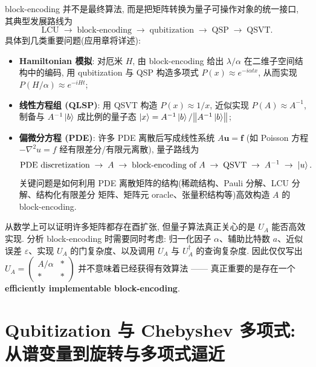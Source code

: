 \documentclass[utf8]{article} %
\numberwithin{equation}{section}   %
\newtheorem{Note}{\hskip 2em {\color{red} 注}}[subsection]
\begin{document}
block-encoding 并不是最终算法, 而是把矩阵转换为量子可操作对象的统一接口, 其典型发展路线为
\begin{equation}
    \text{LCU} \;\to\; \text{block-encoding} \;\to\; \text{qubitization} \;\to\;
    \text{QSP} \;\to\; \text{QSVT}.
\end{equation}
具体到几类重要问题(应用章将详述):
\begin{itemize}
    \item \textbf{Hamiltonian 模拟}: 对厄米 $H$, 由 block-encoding 给出 $\lambda/\alpha$
    在二维子空间结构中的编码, 用 qubitization 与 QSP 构造多项式 $P(x) \approx e^{-i\alpha t x}$,
    从而实现 $P(H/\alpha) \approx e^{-iHt}$;
    \item \textbf{线性方程组 (QLSP)}: 用 QSVT 构造 $P(x) \approx 1/x$, 近似实现
    $P(A) \approx A^{-1}$, 制备与 $A^{-1}\ket{b}$ 成比例的量子态
    $\ket{x} = A^{-1}\ket{b}/\norm{A^{-1}\ket{b}}$;
    \item \textbf{偏微分方程 (PDE)}: 许多 PDE 离散后写成线性系统 $A\mathbf{u} = \mathbf{f}$
    (如 Poisson 方程 $-\nabla^2 u = f$ 经有限差分/有限元离散), 量子路线为
    \begin{equation}
        \text{PDE discretization} \;\to\; A \;\to\; \text{block-encoding of } A
        \;\to\; \text{QSVT} \;\to\; A^{-1} \;\to\; \ket{u}.
    \end{equation}
    关键问题是如何利用 PDE 离散矩阵的结构(稀疏结构、Pauli 分解、LCU 分解、结构化有限差分
    矩阵、矩阵元 oracle、张量积结构等)高效构造 $A$ 的 block-encoding.
\end{itemize}

\begin{Note}[真正的算法成本]
    从数学上可以证明许多矩阵都存在酉扩张, 但量子算法真正关心的是 $U_A$ 能否高效实现.
    分析 block-encoding 时需要同时考虑: 归一化因子 $\alpha$、辅助比特数 $a$、近似误差
    $\varepsilon$、实现 $U_A$ 的门复杂度、以及调用 $U_A$ 与 $U_A^\dagger$ 的查询复杂度.
    因此仅仅写出 $U_A = \begin{pmatrix} A/\alpha & \ast \\ \ast & \ast \end{pmatrix}$
    并不意味着已经获得有效算法 —— 真正重要的是存在一个
    \textbf{efficiently implementable block-encoding}.
\end{Note}

\section{Qubitization 与 Chebyshev 多项式: 从谱变量到旋转与多项式逼近}
\end{document}
